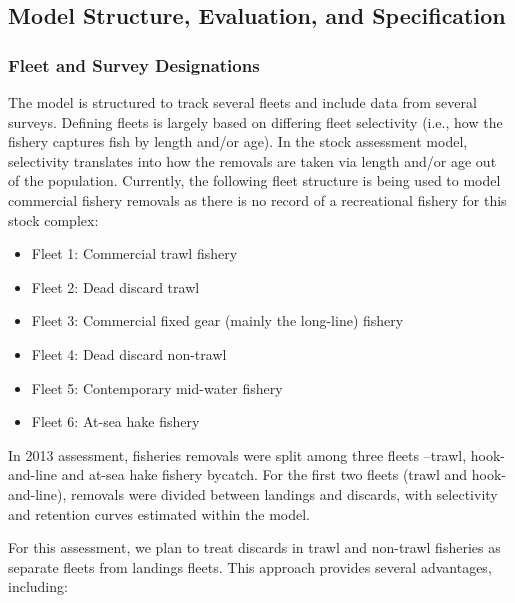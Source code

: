 \documentclass[
]{scrartcl}
\providecommand{\tightlist}{%
  \setlength{\itemsep}{0pt}\setlength{\parskip}{0pt}}\usepackage{longtable,booktabs,array}
\begin{document}
\subsection{Model Structure, Evaluation, and
Specification}\label{model-structure-evaluation-and-specification}

\subsubsection{Fleet and Survey
Designations}\label{fleet-and-survey-designations}

The model is structured to track several fleets and include data from
several surveys. Defining fleets is largely based on differing fleet
selectivity (i.e., how the fishery captures fish by length and/or age).
In the stock assessment model, selectivity translates into how the
removals are taken via length and/or age out of the population.
Currently, the following fleet structure is being used to model
commercial fishery removals as there is no record of a recreational
fishery for this stock complex:

\begin{itemize}
\tightlist
\item
  Fleet 1: Commercial trawl fishery
\item
  Fleet 2: Dead discard trawl
\item
  Fleet 3: Commercial fixed gear (mainly the long-line) fishery
\item
  Fleet 4: Dead discard non-trawl
\item
  Fleet 5: Contemporary mid-water fishery
\item
  Fleet 6: At-sea hake fishery
\end{itemize}

In 2013 assessment, fisheries removals were split among three fleets
--trawl, hook-and-line and at-sea hake fishery bycatch. For the first
two fleets (trawl and hook-and-line), removals were divided between
landings and discards, with selectivity and retention curves estimated
within the model.

For this assessment, we plan to treat discards in trawl and non-trawl
fisheries as separate fleets from landings fleets. This approach
provides several advantages, including:
\end{document}
